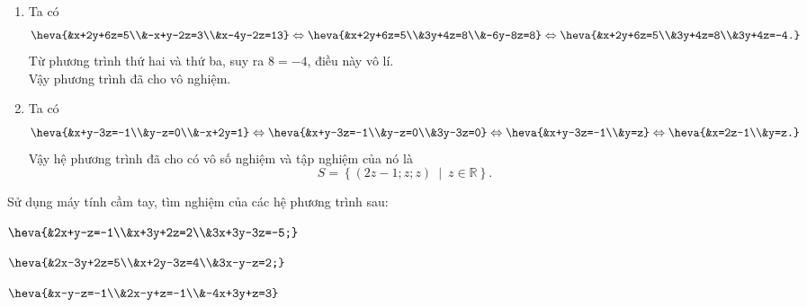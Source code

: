 \begin{bt}
{\begin{enumerate}
\[\begin{aligned}
	 \Leftrightarrow\heva{&x=2\\&y=-3\\&z=-2.}
	\end{aligned}\]
	Vậy phương trình đã cho có nghiệm là $(2;-3;-2)$.
	\item Ta có 
	\[\heva{&x+2y+6z=5\\&-x+y-2z=3\\&x-4y-2z=13}\Leftrightarrow \heva{&x+2y+6z=5\\&3y+4z=8\\&-6y-8z=8}\Leftrightarrow \heva{&x+2y+6z=5\\&3y+4z=8\\&3y+4z=-4.} \]
	Từ phương trình thứ hai và thứ ba, suy ra $8=-4$, điều này vô lí.\\
	Vậy phương trình đã cho vô nghiệm.
	\item Ta có
	\[\heva{&x+y-3z=-1\\&y-z=0\\&-x+2y=1}\Leftrightarrow \heva{&x+y-3z=-1\\&y-z=0\\&3y-3z=0}\Leftrightarrow  \heva{&x+y-3z=-1\\&y=z}\Leftrightarrow \heva{&x=2z-1\\&y=z.}\]
	Vậy hệ phương trình đã cho có vô số nghiệm và tập nghiệm của nó là
	\[S=\left\{(2z-1;z;z)\ \middle | \ z\in\mathbb{R}\right\}.\]
\end{enumerate}
}
\end{bt}
\begin{bt}%
	Sử dụng máy tính cầm tay, tìm nghiệm của các hệ phương trình sau:
	\begin{listEX}[3]
		\item $\heva{&2x+y-z=-1\\&x+3y+2z=2\\&3x+3y-3z=-5;}$
		\item $\heva{&2x-3y+2z=5\\&x+2y-3z=4\\&3x-y-z=2;}$
		\item $\heva{&x-y-z=-1\\&2x-y+z=-1\\&-4x+3y+z=3}$
	\end{listEX}
\end{bt}
